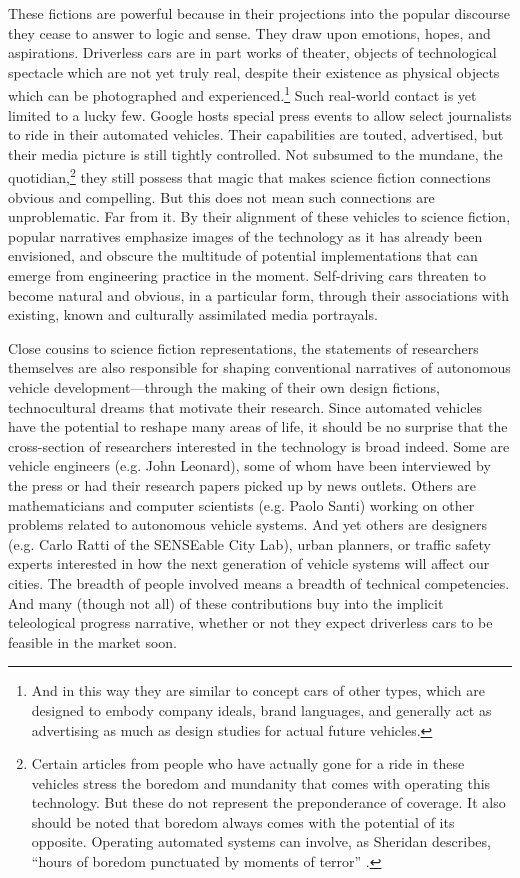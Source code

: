 These fictions are powerful because in their projections into the
popular discourse they cease to answer to logic and
sense. They draw upon emotions, hopes, and aspirations. Driverless cars
are in part works of theater, objects of technological spectacle which
are not yet truly real, despite their existence as physical objects
which can be photographed and experienced.\footnote{And in this way
  they are similar to concept cars of other types, which are designed
  to embody company ideals, brand languages, and generally act as
  advertising as much as design studies for actual future vehicles.}
Such real-world contact is 
yet limited to a lucky few. Google hosts special press events to allow
select journalists
to ride in their automated vehicles. Their capabilities are touted,
advertised, but their media picture is still tightly controlled. Not subsumed
to the mundane, the quotidian,\footnote{Certain articles from people
  who have actually gone for a ride in these vehicles stress the
  boredom and mundanity that comes with operating this
  technology.\cite{rode500} But these do not represent the
  preponderance of coverage. It also should be noted that boredom
  always comes with the potential of its opposite. Operating automated
systems can involve, as Sheridan describes, ``hours of boredom
punctuated by moments of terror'' \cite[p. 339]{sheridan}.} they still
possess that magic that 
makes science fiction connections obvious and compelling. But this
does not mean such connections are unproblematic. Far from it. By
their alignment of these vehicles to science fiction, popular
narratives emphasize images of the technology as it has already been
envisioned, and obscure the multitude of potential implementations
that can emerge from engineering practice in the moment. Self-driving
cars threaten to become natural and obvious, in a particular form,
through their associations with existing, known and culturally
assimilated media portrayals.

Close cousins to science fiction representations, the statements of
researchers themselves are also responsible for 
shaping conventional narratives of autonomous vehicle
development---through the making of their own design fictions,
technocultural dreams that motivate their research.
Since automated vehicles have the potential to reshape many areas of life, it should
be no surprise that the cross-section of researchers interested in the
technology is broad indeed. Some are vehicle engineers (e.g. John Leonard), some of whom have been
interviewed by the press or had their research papers picked up by news outlets.
Others are mathematicians and
computer scientists (e.g. Paolo Santi) working on other problems related to
autonomous vehicle systems. And yet others are designers (e.g. Carlo
Ratti of the SENSEable City Lab), urban
planners, or traffic safety experts interested in how the next
generation of vehicle systems will
affect our cities. The breadth of people involved means a breadth of
technical competencies. And many (though not all) of these contributions buy into the
implicit teleological progress narrative, whether or not they expect
driverless cars to be feasible in the market soon.


